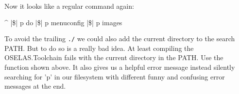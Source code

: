 Now it looks like a regular command again:

\begin{ptxshell}[escapechar=|]{^}
|\$| p do
|\$| p menuconfig
|\$| p images
\end{ptxshell}

\begin{important}
To avoid the trailing \texttt{./} we could also add the current directory to
the search PATH. But to do so is a really bad idea. At least compiling the
OSELAS.Toolchain fails with the current directory in the PATH. Use the function
shown above. It also gives us a helpful error message instead silently
searching for 'p' in our filesystem with different funny and confusing error
messages at the end.
\end{important}

